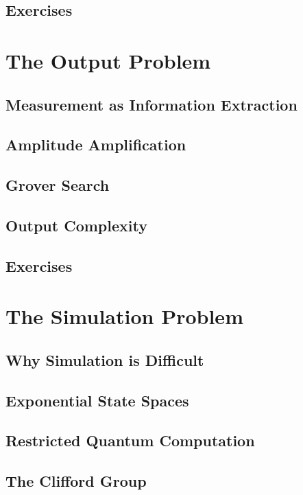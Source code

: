 \documentclass[11pt,a4paper]{article}
\begin{document}
\subsection{Exercises}


\section{The Output Problem}

\subsection{Measurement as Information Extraction}

\subsection{Amplitude Amplification}

\subsection{Grover Search}

\subsection{Output Complexity}

\subsection{Exercises}


\section{The Simulation Problem}

\subsection{Why Simulation is Difficult}

\subsection{Exponential State Spaces}

\subsection{Restricted Quantum Computation}

\subsection{The Clifford Group}
\end{document}
